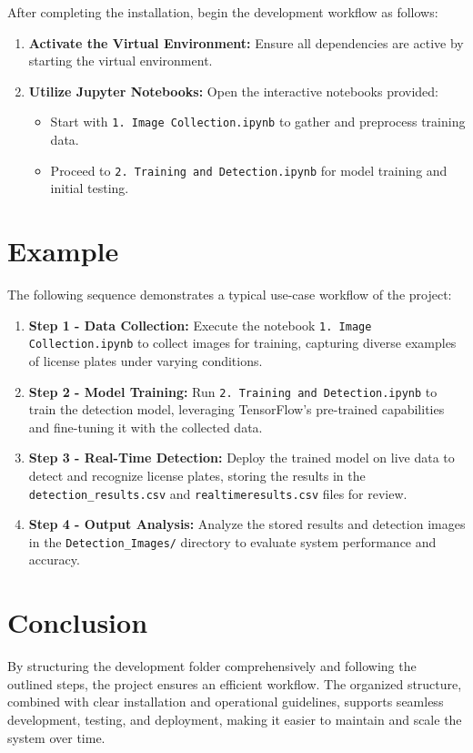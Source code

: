 After completing the installation, begin the development workflow as follows:

\begin{enumerate}
	\item \textbf{Activate the Virtual Environment:} Ensure all dependencies are active by starting the virtual environment.
	\item \textbf{Utilize Jupyter Notebooks:} Open the interactive notebooks provided:
	\begin{itemize}
		\item Start with \texttt{1. Image Collection.ipynb} to gather and preprocess training data.
		\item Proceed to \texttt{2. Training and Detection.ipynb} for model training and initial testing.
	\end{itemize}
\end{enumerate}

\section{Example}

The following sequence demonstrates a typical use-case workflow of the project:

\begin{enumerate}
	\item \textbf{Step 1 - Data Collection:} Execute the notebook \texttt{1. Image Collection.ipynb} to collect images for training, capturing diverse examples of license plates under varying conditions.
	\item \textbf{Step 2 - Model Training:} Run \texttt{2. Training and Detection.ipynb} to train the detection model, leveraging TensorFlow’s pre-trained capabilities and fine-tuning it with the collected data.
	\item \textbf{Step 3 - Real-Time Detection:} Deploy the trained model on live data to detect and recognize license plates, storing the results in the \texttt{detection\_results.csv} and \texttt{realtimeresults.csv} files for review.
	\item \textbf{Step 4 - Output Analysis:} Analyze the stored results and detection images in the \texttt{Detection\_Images/} directory to evaluate system performance and accuracy.
\end{enumerate}

\section{Conclusion}

By structuring the development folder comprehensively and following the outlined steps, the project ensures an efficient workflow. The organized structure, combined with clear installation and operational guidelines, supports seamless development, testing, and deployment, making it easier to maintain and scale the system over time.
